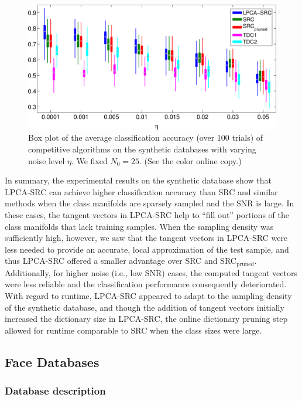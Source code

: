 \documentclass[review]{elsarticle}
\begin{document}
\begin{figure}[t]
\begin{center}
\includegraphics[width=0.95\linewidth]{Fig_3}
\caption{Box plot of the average classification accuracy (over 100 trials) of competitive algorithms on the synthetic databases with varying noise level $\eta$. We fixed $N_0 = 25$. (See the color online copy.)}
\label{syn_data_set_varying_noise}
\end{center}
\end{figure}



In summary, the experimental results on the synthetic database show that LPCA-SRC can achieve higher classification accuracy than SRC and similar methods when the class manifolds are sparsely sampled and the SNR is large. In these cases, the tangent vectors in LPCA-SRC help to ``fill out'' portions of the class manifolds that lack training samples. When the sampling density was sufficiently high, however, we saw that the tangent vectors in LPCA-SRC were less needed to provide an accurate, local approximation of the test sample, and thus LPCA-SRC offered a smaller advantage over SRC and SRC$_\mathrm{pruned}$. Additionally, for higher noise (i.e., low SNR) cases, the computed tangent vectors were less reliable and the classification performance consequently deteriorated. With regard to runtime, LPCA-SRC appeared to adapt to the sampling density of the synthetic database, and though the addition of tangent vectors initially increased the dictionary size in LPCA-SRC, the online dictionary pruning step allowed for runtime comparable to SRC when the class sizes were large.


\subsection{Face Databases} 

\subsubsection{Database description}
\end{document}
